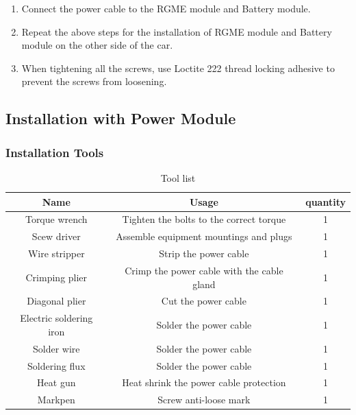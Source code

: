 \documentclass{article}
\begin{document}
\begin{enumerate}
\begin{center}
    \end{center}
    \item Connect the power cable to the RGME module and Battery module.\\
    \item Repeat the above steps for the installation of RGME module and Battery module on the other side of the car.\\
    \item When tightening all the screws, use Loctite 222 thread locking adhesive to prevent the screws from loosening.\\
\end{enumerate}



\subsection{Installation with Power Module}
\subsubsection{Installation Tools}
\begin{table}[htbp] %
    \centering %
    \caption{Tool list} %
    \begin{tabular}{|c|c|c|} 
        \hline
        \toprule 
        Name & Usage & quantity\\
        \midrule %
        Torque wrench & Tighten the bolts to the correct torque & 1 \\ \hline
        Scew driver & Assemble equipment mountings and plugs & 1 \\ \hline
        Wire stripper & Strip the power cable & 1 \\ \hline
        Crimping plier & Crimp the power cable with the cable gland & 1 \\ \hline
        Diagonal plier & Cut the power cable & 1 \\ \hline
        Electric soldering iron & Solder the power cable & 1 \\ \hline
        Solder wire & Solder the power cable & 1 \\ \hline
        Soldering flux & Solder the power cable & 1 \\ \hline
        Heat gun & Heat shrink the power cable protection & 1 \\ \hline
        Markpen & Screw anti-loose mark & 1 \\ \hline
        \bottomrule %
    \end{tabular}
\end{table}
\end{document}
